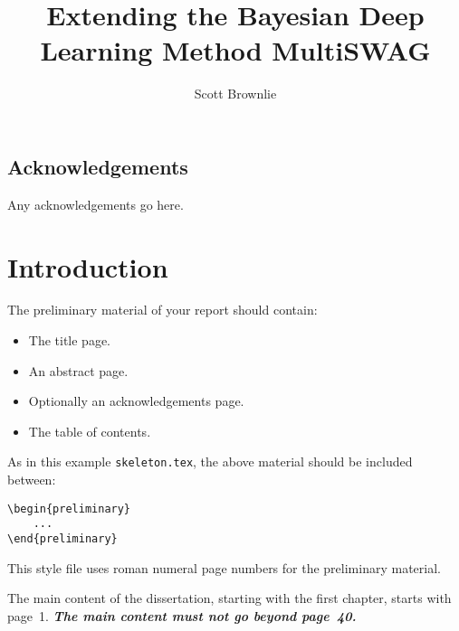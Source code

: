\documentclass[msc,deptreport.inf]{infthesis} %
\begin{document}
\begin{preliminary}

\title{Extending the Bayesian Deep Learning Method MultiSWAG}

\author{Scott Brownlie}


\maketitle

\section*{Acknowledgements}
Any acknowledgements go here.

\tableofcontents
\end{preliminary}


\chapter{Introduction}

The preliminary material of your report should contain:
\begin{itemize}
\item
The title page.
\item
An abstract page.
\item
Optionally an acknowledgements page.
\item
The table of contents.
\end{itemize}

As in this example \texttt{skeleton.tex}, the above material should be
included between:
\begin{verbatim}
\begin{preliminary}
    ...
\end{preliminary}
\end{verbatim}
This style file uses roman numeral page numbers for the preliminary material.

The main content of the dissertation, starting with the first chapter,
starts with page~1. \emph{\textbf{The main content must not go beyond page~40.}}
\end{document}
